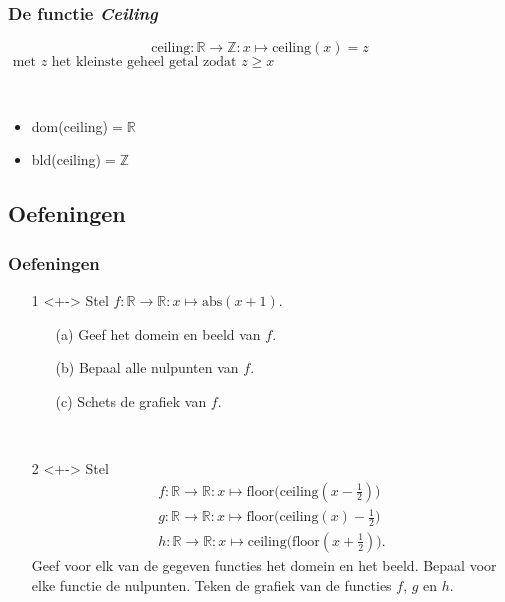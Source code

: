 \begin{frame}
\frametitle{De functie {\em Ceiling\/}}
\pause
\begin{definitie}
\[\mbox{ceiling}:\mathbb{R}\rightarrow \mathbb{Z}:x\mapsto \mbox{ceiling}(x)=z\]
$\mbox{ met } z \mbox{ het kleinste geheel getal zodat } z\geq x$
\end{definitie}
~\\
\pause
\begin{eigenschap}
\begin{itemize}
\item<+-> dom(ceiling)$=\mathbb{R}$
\item<+-> bld(ceiling)$=\mathbb{Z}$
\end{itemize}
\end{eigenschap}
\end{frame}

\subsection*{Oefeningen}
\begin{frame}
\frametitle{Oefeningen}
\pause
\begin{enumerate}
\item[1]<+-> Stel $f:\mathbb{R}\rightarrow \mathbb{R}: x\mapsto \mbox{abs}(x+1)$.
      \begin{enumerate}
      \item[(a)] Geef het domein en beeld van $f$.
      \item[(b)] Bepaal alle nulpunten van $f$.
      \item[(c)] Schets de grafiek van $f$.
      \end{enumerate}
      ~\\
      \pause
\item[2]<+-> Stel 
\[\begin{array}{l}
  f:\mathbb{R}\rightarrow \mathbb{R}: x\mapsto \mbox{floor(ceiling}(x-\frac{1}{2}))\\
  g:\mathbb{R}\rightarrow \mathbb{R}: x\mapsto \mbox{floor(ceiling}(x)-\frac{1}{2})\\ 
  h:\mathbb{R}\rightarrow \mathbb{R}: x\mapsto \mbox{ceiling(floor}(x+\frac{1}{2})). 
	\end{array}\]
 Geef voor elk van de gegeven functies het domein en het beeld. Bepaal voor elke functie de nulpunten.
 Teken de grafiek van de functies $f$, $g$ en $h$.
\end{enumerate}
\end{frame}

